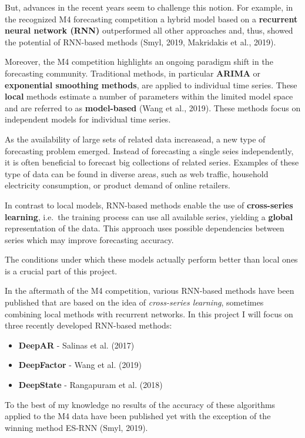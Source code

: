 \documentclass[11pt]{article}
\providecommand{\tightlist}{%
      \setlength{\itemsep}{0pt}\setlength{\parskip}{0pt}}
\begin{document}
But, advances in the recent years seem to challenge this notion. For
example, in the recognized M4 forecasting competition a hybrid model
based on a \textbf{recurrent neural network (RNN)} outperformed all
other approaches and, thus, showed the potential of RNN-based methods
(Smyl, 2019, Makridakis et al., 2019).

Moreover, the M4 competition highlights an ongoing paradigm shift in the
forecasting community. Traditional methods, in particular \textbf{ARIMA}
or \textbf{exponential smoothing methods}, are applied to individual
time series. These \textbf{local} methods estimate a number of
parameters within the limited model space and are referred to as
\textbf{model-based} (Wang et al., 2019). These methods focus on
independent models for individual time series.

As the availability of large sets of related data increasead, a new type
of forecasting problem emerged. Instead of forecasting a single seies
independently, it is often beneficial to forecast big collections of
related series. Examples of these type of data can be found in diverse
areas, such as web traffic, household electricity consumption, or
product demand of online retailers.

In contrast to local models, RNN-based methods enable the use of
\textbf{cross-series learning}, i.e.~the training process can use all
available series, yielding a \textbf{global} representation of the data.
This approach uses possible dependencies between series which may
improve forecasting accuracy.

The conditions under which these models actually perform better than
local ones is a crucial part of this project.

In the aftermath of the M4 competition, various RNN-based methods have
been published that are based on the idea of \emph{cross-series
learning}, sometimes combining local methods with recurrent networks. In
this project I will focus on three recently developed RNN-based methods:

\begin{itemize}
\tightlist
\item
  \textbf{DeepAR} - Salinas et al. (2017)
\item
  \textbf{DeepFactor} - Wang et al. (2019)
\item
  \textbf{DeepState} - Rangapuram et al. (2018)
\end{itemize}

To the best of my knowledge no results of the accuracy of these
algorithms applied to the M4 data have been published yet with the
exception of the winning method ES-RNN (Smyl, 2019).
\end{document}
